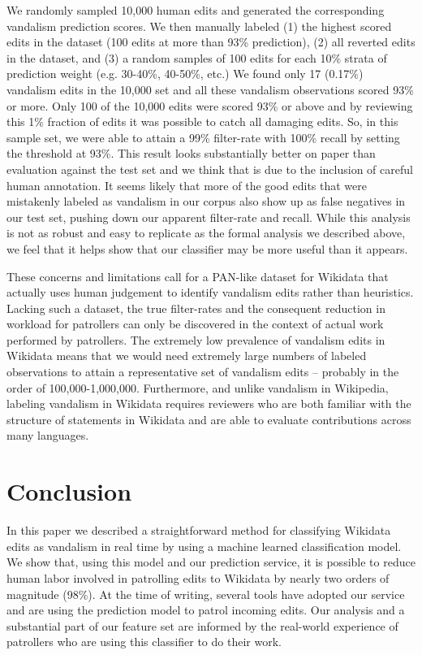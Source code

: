 \documentclass{sig-alternate-2013}
\begin{document}
We randomly sampled 10,000 human edits and generated the corresponding vandalism prediction scores.  We then manually labeled (1) the highest scored edits in the dataset (100 edits at more than 93\% prediction), (2) all reverted edits in the dataset, and (3) a random samples of 100 edits for each 10\% strata of prediction weight (e.g. 30-40\%, 40-50\%, etc.)  We found only 17 (0.17\%) vandalism edits in the 10,000 set and all these vandalism observations scored 93\% or more. Only 100 of the 10,000 edits were scored 93\% or above and by reviewing this 1\% fraction of edits it was possible to catch all damaging edits. So, in this sample set, we were able to attain a 99\% filter-rate with 100\% recall by setting the threshold at 93\%.  This result looks substantially better on paper than evaluation against the test set and we think that is due to the inclusion of careful human annotation. It seems likely that more of the good edits that were mistakenly labeled as vandalism in our corpus also show up as false negatives in our test set, pushing down our apparent filter-rate and recall. While this analysis is not as robust and easy to replicate as the formal analysis we described above, we feel that it helps show that our classifier may be more useful than it appears.

These concerns and limitations call for a PAN-like dataset for Wikidata that actually uses human judgement to identify vandalism edits rather than heuristics. Lacking such a dataset, the true filter-rates and the consequent reduction in workload for patrollers can only be discovered in the context of actual work performed by patrollers. The extremely low prevalence of vandalism edits in Wikidata means that we would need extremely large numbers of labeled observations to attain a representative set of vandalism edits -- probably in the order of 100,000-1,000,000. Furthermore, and unlike vandalism in Wikipedia, labeling vandalism in Wikidata requires reviewers who are both familiar with the structure of statements in Wikidata and are able to evaluate contributions across many languages.

\section{Conclusion}
In this paper we described a straightforward method for classifying Wikidata edits as vandalism in real time by using a machine learned classification model. We show that, using this model and our prediction service, it is possible to reduce human labor involved in patrolling edits to Wikidata by nearly two orders of magnitude (98\%). At the time of writing, several tools have adopted our service and are using the prediction model to patrol incoming edits. Our analysis and a substantial part of our feature set are informed by the real-world experience of patrollers who are using this classifier to do their work.
\end{document}
